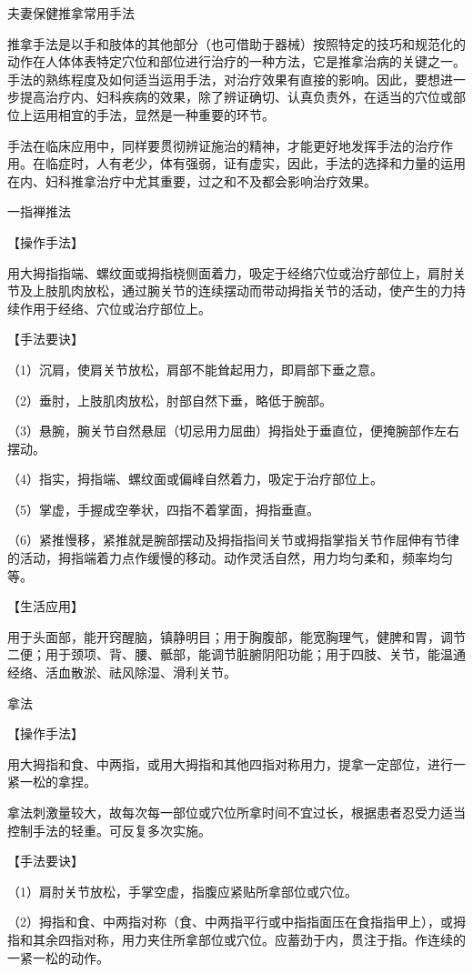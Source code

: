\documentclass[12pt,UTF8]{ctexbook}
\begin{document}
夫妻保健推拿常用手法


推拿手法是以手和肢体的其他部分（也可借助于器械）按照特定的技巧和规范化的动作在人体体表特定穴位和部位进行治疗的一种方法，它是推拿治病的关键之一。手法的熟练程度及如何适当运用手法，对治疗效果有直接的影响。因此，要想进一步提高治疗内、妇科疾病的效果，除了辨证确切、认真负责外，在适当的穴位或部位上运用相宜的手法，显然是一种重要的环节。

手法在临床应用中，同样要贯彻辨证施治的精神，才能更好地发挥手法的治疗作用。在临症时，人有老少，体有强弱，证有虚实，因此，手法的选择和力量的运用在内、妇科推拿治疗中尤其重要，过之和不及都会影响治疗效果。

一指禅推法

【操作手法】

用大拇指指端、螺纹面或拇指桡侧面着力，吸定于经络穴位或治疗部位上，肩肘关节及上肢肌肉放松，通过腕关节的连续摆动而带动拇指关节的活动，使产生的力持续作用于经络、穴位或治疗部位上。

【手法要诀】

（1）沉肩，使肩关节放松，肩部不能耸起用力，即肩部下垂之意。

（2）垂肘，上肢肌肉放松，肘部自然下垂，略低于腕部。

（3）悬腕，腕关节自然悬屈（切忌用力屈曲）拇指处于垂直位，便掩腕部作左右摆动。

（4）指实，拇指端、螺纹面或偏峰自然着力，吸定于治疗部位上。

（5）掌虚，手握成空拳状，四指不着掌面，拇指垂直。

（6）紧推慢移，紧推就是腕部摆动及拇指指间关节或拇指掌指关节作屈伸有节律的活动，拇指端着力点作缓慢的移动。动作灵活自然，用力均匀柔和，频率均匀等。

【生活应用】

用于头面部，能开窍醒脑，镇静明目；用于胸腹部，能宽胸理气，健脾和胃，调节二便；用于颈项、背、腰、骶部，能调节脏腑阴阳功能；用于四肢、关节，能温通经络、活血散淤、祛风除湿、滑利关节。

拿法

【操作手法】

用大拇指和食、中两指，或用大拇指和其他四指对称用力，提拿一定部位，进行一紧一松的拿捏。

拿法刺激量较大，故每次每一部位或穴位所拿时间不宜过长，根据患者忍受力适当控制手法的轻重。可反复多次实施。

【手法要诀】

（1）肩肘关节放松，手掌空虚，指腹应紧贴所拿部位或穴位。

（2）拇指和食、中两指对称（食、中两指平行或中指指面压在食指指甲上），或拇指和其余四指对称，用力夹住所拿部位或穴位。应蓄劲于内，贯注于指。作连续的一紧一松的动作。
\end{document}
